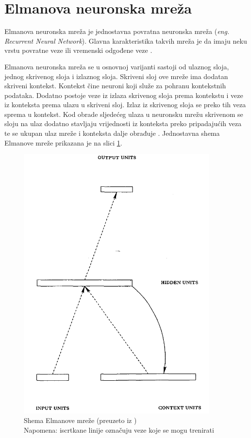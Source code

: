 \documentclass[zavrsnirad]{fer}
\begin{document}
	\section{Elmanova neuronska mreža}
	\label{pog:ElmanovaMreza}
	
		Elmanova neuronska mreža je jednostavna povratna neuronska mreža (\textit{eng. Recurrent Neural Network}). Glavna karakteristika takvih mreža je da imaju neku vrstu povratne veze ili vremenski odgođene veze \cite{ElmanNetSite}.
		
		Elmanova neuronska mreža se u osnovnoj varijanti sastoji od ulaznog sloja, jednog skrivenog sloja i izlaznog sloja. Skriveni sloj ove mreže ima dodatan skriveni kontekst. Kontekst čine neuroni koji služe za pohranu kontekstnih podataka. Dodatno postoje veze iz izlaza skrivenog sloja prema kontekstu i veze iz konteksta prema ulazu u skriveni sloj. Izlaz iz skrivenog sloja se preko tih veza sprema u kontekst. Kod obrade sljedećeg ulaza u neuronsku mrežu skrivenom se sloju na ulaz dodatno stavljaju vrijednosti iz konteksta preko pripadajućih veza te se ukupan ulaz mreže i konteksta dalje obrađuje \cite{Elman}. Jednostavna shema Elmanove mreže prikazana je na slici \ref{ElmanovaMreza}.
		
		\begin{figure}[htb]
			\centering
			\includegraphics[width=0.9\textwidth]{Extra/ElmanovaMreza.png} 
			\caption{Shema Elmanove mreže (preuzeto iz \cite{Elman}) \\
					 Napomena: iscrtkane linije označuju veze koje se mogu trenirati}
			\label{ElmanovaMreza}
		\end{figure}
		
\end{document}
